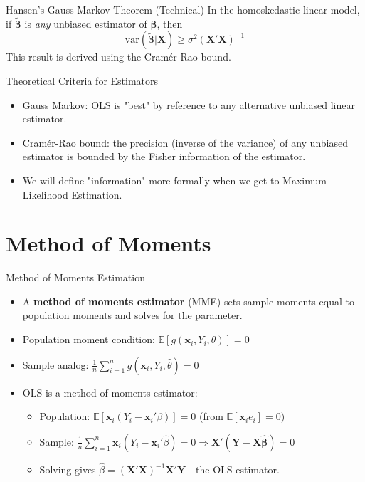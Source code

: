 \documentclass[aspectratio=169, handout]{beamer}
\numberwithin{equation}{section}
\begin{document}
\begin{frame}{Hansen's Gauss Markov Theorem (Technical)}
In the homoskedastic linear model, if $\bm{\tilde{\beta}}$ is  \emph{any} unbiased estimator of $\bm{\beta}$, then
$$\text{var}(\bm{\tilde{\beta}}|\bm{X})\geq \sigma^2\bm{(X'X)}^{-1}$$
This result is derived using the Cram\'{e}r-Rao bound.
\end{frame}

\begin{frame}{Theoretical Criteria for Estimators}
\begin{itemize}
\item Gauss Markov: OLS is "best" by reference to any alternative unbiased linear estimator.
\item Cram\'{e}r-Rao bound: the precision (inverse of the variance) of any unbiased estimator is bounded by the Fisher information of the estimator.
\item We will define "information" more formally when we get to Maximum Likelihood Estimation.
\end{itemize}
\end{frame}

\section{Method of Moments}

\begin{frame}{Method of Moments Estimation}
\begin{itemize}
\item A \textbf{method of moments estimator} (MME) sets sample moments equal to population moments and solves for the parameter.\pause
\item Population moment condition: $\mathbb{E}[g(\bm{x}_i, Y_i, \theta)]=0$
\item Sample analog: $\frac{1}{n}\sum_{i=1}^n g(\bm{x}_i, Y_i, \hat{\theta})=0$\pause
\item OLS is a method of moments estimator:
\begin{itemize}
\item Population: $\mathbb{E}[\bm{x}_i(Y_i-\bm{x}_i'\beta)]=0$ \quad (from $\mathbb{E}[\bm{x}_i e_i]=0$)
\item Sample: $\frac{1}{n}\sum_{i=1}^n \bm{x}_i(Y_i-\bm{x}_i'\hat{\beta})=0$\quad $\Rightarrow$\quad $\bm{X'(Y-X\hat{\beta})}=0$
\item Solving gives $\hat{\beta}=(\bm{X'X})^{-1}\bm{X'Y}$---the OLS estimator.
\end{itemize}
\end{itemize}
\end{frame}
\end{document}

